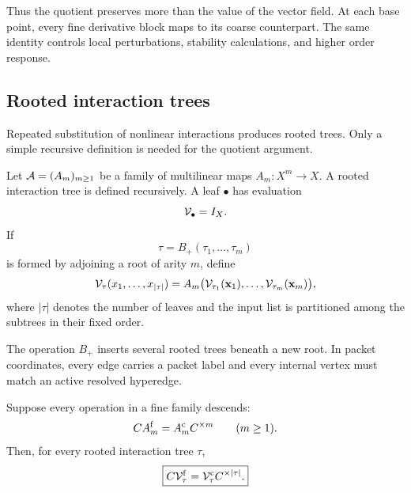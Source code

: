 Thus the quotient preserves more than the value of the vector field.  At each base point, every fine derivative block maps to its coarse counterpart.  The same identity controls local perturbations, stability calculations, and higher order response.

\subsection{Rooted interaction trees}
Repeated substitution of nonlinear interactions produces rooted trees.  Only a simple recursive definition is needed for the quotient argument.

\begin{PRIQdefinition}\label{PRIQ:def:tree-evaluation}
Let $\mathcal A=(A_m)_{m\geq1}$ be a family of multilinear maps $A_m:X^m\to X$.  A rooted interaction tree is defined recursively.  A leaf $\bullet$ has evaluation
\[
  \mathcal V_{\bullet}=I_X.
\]
If
\[
  \tau=B_+(\tau_1,\ldots,\tau_m)
\]
is formed by adjoining a root of arity $m$, define
\begin{equation}\label{PRIQ:eq:tree-evaluation}
  \mathcal V_{\tau}(x_1,\ldots,x_{|\tau|})
  =
  A_m\bigl(
  \mathcal V_{\tau_1}(\mathbf x_1),\ldots,
  \mathcal V_{\tau_m}(\mathbf x_m)
  \bigr),
\end{equation}
where $|\tau|$ denotes the number of leaves and the input list is partitioned among the subtrees in their fixed order.
\end{PRIQdefinition}

The operation $B_+$ inserts several rooted trees beneath a new root.  In packet coordinates, every edge carries a packet label and every internal vertex must match an active resolved hyperedge.

\begin{PRIQtheorem}\label{PRIQ:thm:treewise-quotient}
Suppose every operation in a fine family descends:
\[
  CA_m^{\mathrm f}=A_m^{\mathrm c}C^{\times m}
  \qquad(m\geq1).
\]
Then, for every rooted interaction tree $\tau$,
\begin{equation}\label{PRIQ:eq:treewise-quotient}
  \boxed{
  C\mathcal V_{\tau}^{\mathrm f}
  =
  \mathcal V_{\tau}^{\mathrm c}C^{\times |\tau|}.}
\end{equation}
\end{PRIQtheorem}

